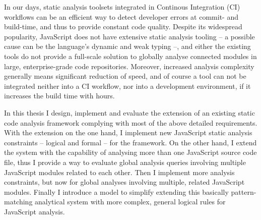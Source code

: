 	In our days, static analysis toolsets integrated in Continous Integration (CI) workflows can be an efficient way to detect developer errors at commit- and build-time, and thus to provide constant code quality. Despite its widespread popularity, JavaScript does not have extensive static analysis tooling – a possible cause can be the language's dynamic and weak typing –, and either the existing tools do not provide a full-scale solution to globally analyse connected modules in large, enterprise-grade code repositories. Moreover, increased analysis complexity generally means significant reduction of speed, and of course a tool can not be integrated neither into a CI workflow, nor into a development environment, if it increases the build time with hours.

	In this thesis I design, implement and evaluate the extension of an existing static code analysis framework complying with most of the above detailed requirements. With the extension on the one hand, I implement new JavaScript static analysis constraints – logical and formal – for the framework. On the other hand, I extend the system with the capability of analysing more than one JavaScript source code file, thus I provide a way to evaluate global analysis queries involving multiple JavaScript modules related to each other. Then I implement more analysis constraints, but now for global analyses involving multiple, related JavaScript modules. Finally I introduce a model to simplify extending this basically pattern-matching analytical system with more complex, general logical rules for JavaScript analysis.

